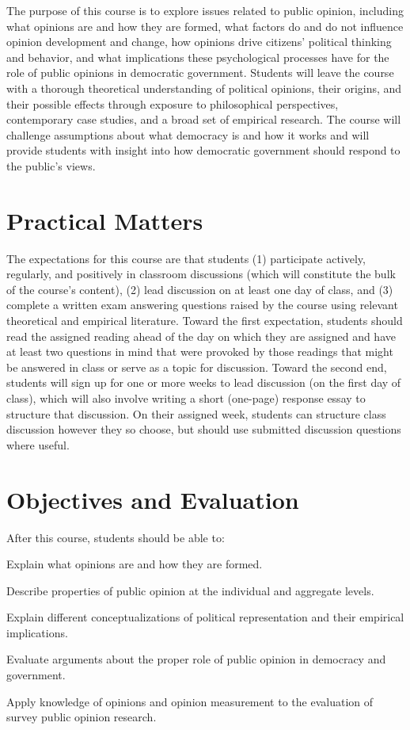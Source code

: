 \documentclass[12pt,a4paper]{article}
\begin{document}
The purpose of this course is to explore issues related to public opinion, including what opinions are and how they are formed, what factors do and do not influence opinion development and change, how opinions drive citizens' political thinking and behavior, and what implications these psychological processes have for the role of public opinions in democratic government. Students will leave the course with a thorough theoretical understanding of political opinions, their origins, and their possible effects through exposure to philosophical perspectives, contemporary case studies, and a broad set of empirical research. The course will challenge assumptions about what democracy is and how it works and will provide students with insight into how democratic government should respond to the public's views.

\section{Practical Matters}

The expectations for this course are that students (1) participate actively, regularly, and positively in classroom discussions (which will constitute the bulk of the course's content), (2) lead discussion on at least one day of class, and (3) complete a written exam answering questions raised by the course using relevant theoretical and empirical literature. Toward the first expectation, students should read the assigned reading ahead of the day on which they are assigned and have at least two questions in mind that were provoked by those readings that might be answered in class or serve as a topic for discussion. Toward the second end, students will sign up for one or more weeks to lead discussion (on the first day of class), which will also involve writing a short (one-page) response essay to structure that discussion. On their assigned week, students can structure class discussion however they so choose, but should use submitted discussion questions where useful.

\section{Objectives and Evaluation}
After this course, students should be able to:
\begin{enumerate*}
\item Explain what opinions are and how they are formed.
\item Describe properties of public opinion at the individual and aggregate levels.
\item Explain different conceptualizations of political representation and their empirical implications.
\item Evaluate arguments about the proper role of public opinion in democracy and government.
\item Apply knowledge of opinions and opinion measurement to the evaluation of survey public opinion research.
\end{enumerate*}
\end{document}
